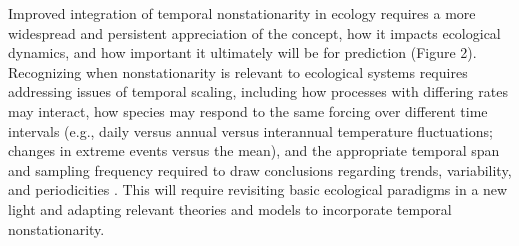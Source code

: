 \documentclass[11pt,a4paper,oneside]{article}
\begin{document}
Improved integration of temporal nonstationarity in ecology requires a more widespread and persistent appreciation of the concept, how it impacts ecological dynamics, and how important it ultimately will be for prediction (Figure 2). Recognizing when nonstationarity is relevant to ecological systems requires addressing issues of temporal scaling, including how processes with differing rates may interact, how species may respond to the same forcing over different time intervals (e.g., daily versus annual versus interannual temperature fluctuations; changes in extreme events versus the mean), and the appropriate temporal span and sampling frequency required to draw conclusions regarding trends, variability, and periodicities \citep[e.g.,][]{delcourt1983}. This will require revisiting basic ecological paradigms in a new light and adapting relevant theories and models to incorporate temporal nonstationarity. \\
\end{document}
